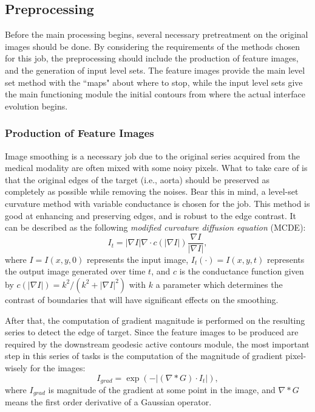\subsection{Preprocessing}

Before the main processing begins, several necessary pretreatment on the original images should be done.
By considering the requirements of the methods chosen for this job, the preprocessing should include the production of feature images, and the generation of input level sets.
The feature images provide the main level set method with the ``maps" about where to stop, while the input level sets give the main functioning module the initial contours from where the actual interface evolution begins.

\subsubsection{Production of Feature Images}

Image smoothing is a necessary job due to the original series acquired from the medical modality are often mixed with some noisy pixels.
What to take care of is that the original edges of the target (i.e., aorta) should be preserved as completely as possible while removing the noises.
Bear this in mind, a level-set curvature method with variable conductance \cite{Whitaker2001} is chosen for the job.
This method is good at enhancing and preserving edges, and is robust to the edge contrast.
It can be described as the following \emph{modified curvature diffusion equation} (MCDE):
\begin{equation}
\label{eqn:MCDE}
I_t = |\nabla I| \nabla \cdot c(|\nabla I|) \frac{\nabla I}{|\nabla I|},
\end{equation}
where $I = I(x, y, 0)$ represents the input image, $I_t(\cdot) = I(x, y, t)$ represents the output image generated over time $t$, and $c$ is the conductance function given by
$c(|\nabla I|) = k^2/(k^2 + |\nabla I|^2)$ with $k$ a parameter which determines the contrast of boundaries that will have significant effects on the smoothing.

After that, the computation of gradient magnitude is performed on the resulting series to detect the edge of target.
Since the feature images to be produced are required by the downstream geodesic active contours module, the most important step in this series of tasks is the computation of the magnitude of gradient pixel-wisely for the images:
\begin{equation}
\label{eqn:Gaussian}
I_{grad} = \exp(-|(\nabla \ast G) \cdot I_t|),
\end{equation}
where $I_{grad}$ is magnitude of the gradient at some point in the image, and $\nabla \ast G$ means the first order derivative of a Gaussian operator.

